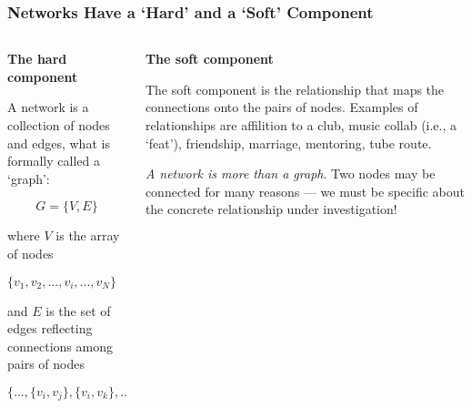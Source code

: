 \documentclass[notes, aspectratio=1610]{beamer}
\begin{document}
\begin{frame}[t]
	\frametitle{Networks Have a `Hard' and a `Soft' Component}
	\begin{small}
	\begin{columns}[t]
		\begin{column}{0.45\textwidth}
			\begin{center}
				\textbf{The hard component}
			\end{center}

			A network is a collection of nodes and edges, what is
			formally called a `graph':

			\vspace{-0.75em}

			\begin{equation}
				G = \{V, E\}
			\end{equation}

			where $V$ is the array of nodes 

			\vspace{1em}

			$\{v_{1}, v_{2}, ... , v_{i}, ... , v_{N}\}$
			
			\vspace{1em}
			
			and $E$ is the set of edges reflecting connections among
			pairs of nodes

			\vspace{1em}
			
			$\{..., \{v_{i}, v_{j}\}, \{v_{i}, v_{k}\}, ...\}$
		\end{column}
		\begin{column}{0.45\textwidth}
			\begin{center}
				\textbf{The soft component}
			\end{center}

			The soft component is the relationship that maps 
			the connections onto the pairs of nodes.
			Examples of relationships are affilition to a club,
		        music collab (i.e., a `feat'), friendship, marriage, 
			mentoring, tube route.

			\begin{tcolorbox}[
				colback=comp_c!5!white,
				colframe=comp_c!90!black,
				title={\centering !! Pay attention !!}]
				\emph{A network is more than a graph}. 
				Two nodes may be connected for many reasons --- 
				we must be specific about the concrete 
				relationship under investigation!
			\end{tcolorbox}
		\end{column}
	\end{columns}
\end{small}
\end{frame}
\end{document}
